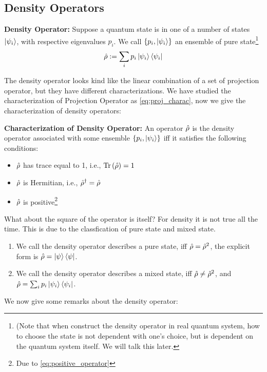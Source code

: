 \subsection{Density Operators}
\begin{definition}{\textbf{Density Operator:}}
    Suppose a quantum state is in one of a number of states $\ket{\psi_i}$, with respective eigenvalues $p_i$. We call $\{ p_i,\ket{\psi_i} \}$ an ensemble of pure state\footnote{(Note that when construct the density operator in real quantum system, how to choose the state is not dependent with one's choice, but is dependent on the quantum system itself. We will talk this later.}
    \begin{eqnarray}
        \hat{\rho} := \sum_{i}p_i \ket{\psi_i} \bra{\psi_i}
    \end{eqnarray}
\end{definition}
The density operator looks kind like the linear combination of a set of projection operator, but they have different characterizations. We have studied the characterization of Projection Operator as \cref{eq:proj_charac}, now we give the characterization of density operators: 
\begin{theorem}{\textbf{Characterization of Density Operator:}}
    An operator $\hat{\rho}$ is the density operator associated with some ensemble $\{ p_i,\ket{\psi_i} \}$ iff it satisfies the following conditions: 
    \begin{itemize}
        \item $\hat{\rho}$ has trace equal to 1, i.e., $\mathrm{Tr}\left( \hat{\rho} \right) = 1$
        \item $\hat{\rho}$ is Hermitian, i.e., $\hat{\rho}^ \dag = \hat{\rho} $ 
        \item $\hat{\rho}$ is positive\footnote{Due to \cref{eq:positive_operator}}
    \end{itemize}
\end{theorem}
What about the square of the operator is itself? For density it is not true all the time. This is due to the classfication of pure state and mixed state. 
\begin{enumerate}
    \item We call the density operator describes a pure state, iff $\hat{\rho} = \hat{\rho}^2 $, the explicit form is $\hat{\rho} = \ket{\psi} \bra{\psi}$.
    \item We call the density operator describes a mixed state, iff $\hat{\rho} \neq \hat{\rho}^2 $, and $\hat{\rho} = \sum_{i}p_i \ket{\psi_i} \bra{\psi_i}$.
\end{enumerate}
We now give some remarks about the density operator: 
